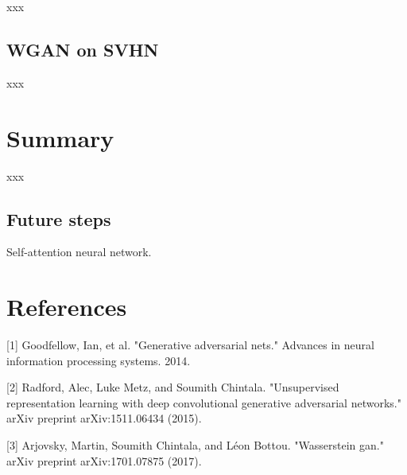 \documentclass{article}
\begin{document}
xxx

\subsection{WGAN on SVHN}

xxx

\section{Summary}

xxx

\subsection{Future steps}

Self-attention neural network.

\section*{References}

[1] Goodfellow, Ian, et al. "Generative adversarial nets." Advances in neural information processing systems. 2014.

[2] Radford, Alec, Luke Metz, and Soumith Chintala. "Unsupervised representation learning with deep convolutional generative adversarial networks." arXiv preprint arXiv:1511.06434 (2015).

[3] Arjovsky, Martin, Soumith Chintala, and Léon Bottou. "Wasserstein gan." arXiv preprint arXiv:1701.07875 (2017).
\end{document}
